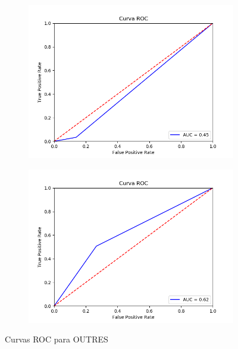 \begin{figure}[H]
	\centering
	\begin{subfigure}{.49\textwidth}
		\centering
		\includegraphics[scale=0.42]{imagenes/imgs-exp1/roc/OUTRES_vertebral}
	\end{subfigure}
	\begin{subfigure}{.49\textwidth}
		\centering
		\includegraphics[scale=0.42]{imagenes/imgs-exp1/roc/OUTRES_breastw}
	\end{subfigure}
	\caption{Curvas ROC para OUTRES}
	\label{ROC_OUTRES}
\end{figure}

